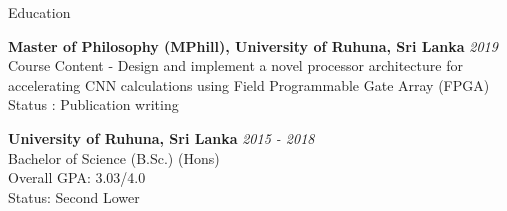 \documentclass[
	11pt, %
]{./assets/resume} %
\begin{document}
\begin{rSection}{Education}

	\textbf{Master of Philosophy (MPhill), University of Ruhuna, Sri Lanka} \hfill \textit{2019} \\ 
	Course Content - Design and implement a novel processor architecture for accelerating CNN calculations using Field Programmable Gate Array (FPGA) \\
	Status : Publication writing

	\textbf{University of Ruhuna, Sri Lanka} \hfill \textit{2015 - 2018} \\ 
	Bachelor of Science (B.Sc.) (Hons)\\
	Overall GPA: 3.03/4.0 \\
	Status: Second Lower
	
\end{rSection}

\end{document}
